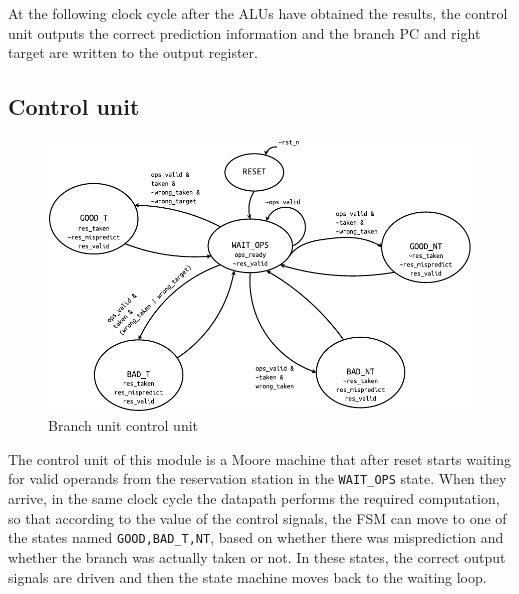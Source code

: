 At the following clock cycle after the ALUs have obtained the results, the control unit outputs the correct prediction information and the branch \ac{PC} and right target are written to the output register.

\subsection{Control unit}
\begin{figure}[hbt]
  \centering
  \includegraphics[width=\textwidth]{img/branch_unit_fsm.pdf}
  \caption{Branch unit control unit}
  \label{fig:branch_unit_fsm}
\end{figure}
The control unit of this module is a Moore machine that after reset starts waiting for valid operands from the reservation station in the \texttt{WAIT\_OPS} state. When they arrive, in the same clock cycle the datapath performs the required computation, so that according to the value of the control signals, the \acs{FSM} can move to one of the states named \texttt{{GOOD,BAD}\_{T,NT}}, based on whether there was misprediction and whether the branch was actually taken or not. In these states, the correct output signals are driven and then the state machine moves back to the waiting loop.
